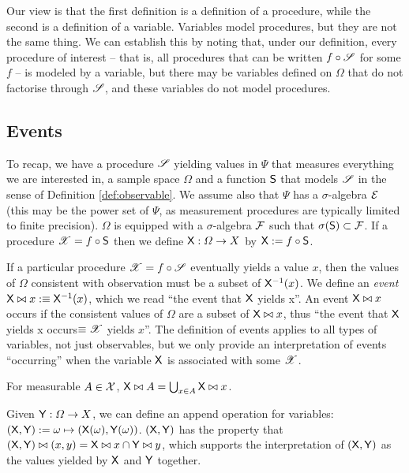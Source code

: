 Our view is that the first definition is a definition of a procedure, while the second is a definition of a variable. Variables model procedures, but they are not the same thing. We can establish this by noting that, under our definition, every procedure of interest -- that is, all procedures that can be written $f\circ \mathscr{S}$ for some $f$ -- is modeled by a variable, but there may be variables defined on $\Omega$ that do not factorise through $\mathscr{S}$, and these variables do not model procedures.

\subsection{Events}

To recap, we have a procedure $\mathscr{S}$ yielding values in $\Psi$ that measures everything we are interested in, a sample space $\Omega$ and a function $\mathsf{S}$ that models $\mathscr{S}$ in the sense of Definition \ref{def:observable}. We assume also that $\Psi$ has a $\sigma$-algebra $\mathcal{E}$ (this may be the power set of $\Psi$, as measurement procedures are typically limited to finite precision). $\Omega$ is equipped with a $\sigma$-algebra $\mathcal{F}$ such that $\sigma(\mathsf{S})\subset \mathcal{F}$. If a procedure $\mathscr{X}=f\circ \mathsf{S}$ then we define $\mathsf{X}:\Omega\to X$ by $\mathsf{X}:=f\circ\mathsf{S}$.

If a particular procedure $\mathscr{X}=f\circ \mathscr{S}$ eventually yields a value $x$, then the values of $\Omega$ consistent with observation must be a subset of $\mathsf{X}^{-1}(x)$. We define an \emph{event} $\mathsf{X}\bowtie x:\equiv \mathsf{X}^{-1}(x)$, which we read ``the event that $\mathsf{X}$ yields x''. An event $\mathsf{X}\bowtie x$ occurs if the consistent values of $\Omega$ are a subset of $\mathsf{X}\bowtie x$, thus ``the event that $\mathsf{X}$ yields x occurs$\equiv \mathscr{X}$ yields $x$''. The definition of events applies to all types of variables, not just observables, but we only provide an interpretation of events ``occurring'' when the variable $\mathsf{X}$ is associated with some $\mathscr{X}$.

For measurable $A\in \mathcal{X}$, $\mathsf{X}\bowtie A=\bigcup_{x\in A} \mathsf{X}\bowtie x$. 

Given $\mathsf{Y}:\Omega\to X$, we can define an append operation for variables: $(\mathsf{X},\mathsf{Y}):=\omega\mapsto (\mathsf{X}(\omega),\mathsf{Y}(\omega))$. $(\mathsf{X},\mathsf{Y})$ has the property that $(\mathsf{X},\mathsf{Y})\bowtie (x,y)= \mathsf{X}\bowtie x\cap \mathsf{Y}\bowtie y$, which supports the interpretation of $(\mathsf{X},\mathsf{Y})$ as the values yielded by $\mathsf{X}$ and $\mathsf{Y}$ together.

